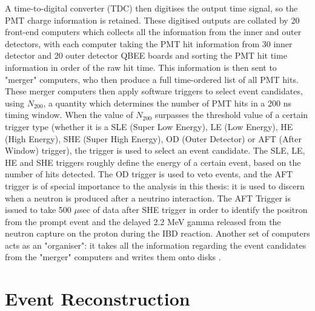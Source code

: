 A time-to-digital converter (TDC) then digitises the output time signal, so the PMT charge information is retained. These digitised outputs are collated by 20 front-end computers which collects all the information from the inner and outer detectors, with each computer taking the PMT hit information from 30 inner detector and 20 outer detector QBEE boards and sorting the PMT hit time information in order of the raw hit time. This information is then sent to "merger" computers, who then produce a full time-ordered list of all PMT hits. These merger computers then apply software triggers to select event candidates, using $N_{200}$, a quantity which determines the number of PMT hits in a 200 ns timing window. When the value of $N_{200}$ surpasses the threshold value of a certain trigger type (whether it is a SLE (Super Low Energy), LE (Low Energy), HE (High Energy), SHE (Super High Energy), OD (Outer Detector) or AFT (After Window) trigger), the trigger is used to select an event candidate. The SLE, LE, HE and SHE triggers roughly define the energy of a certain event, based on the number of hits detected. The OD trigger is used to veto events, and the AFT trigger is of special importance to the analysis in this thesis: it is used to discern when a neutron is produced after a neutrino interaction. The AFT Trigger is issued to take 500 $\mu$sec of data after SHE trigger in order to identify the positron from the prompt event and the delayed 2.2 MeV gamma released from the neutron capture on the proton during the IBD reaction. Another set of computers acts as an "organiser": it takes all the information regarding the event candidates from the "merger" computers and writes them onto disks \cite{fukudaSuperKamiokandeDetector2003}.


\section{Event Reconstruction}

